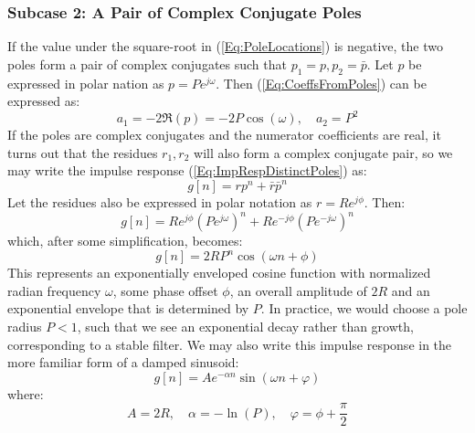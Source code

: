 \subsubsection{Subcase 2: A Pair of Complex Conjugate Poles}
If the value under the square-root in (\ref{Eq:PoleLocations}) is negative, the two poles form a pair of complex conjugates such that $p_1 = p, p_2 = \bar{p}$. Let $p$ be expressed in polar nation as $p = P e^{j \omega}$. Then (\ref{Eq:CoeffsFromPoles}) can be expressed as:
\begin{equation}
\label{Eq:CoeffsFromConjugatePoles}
\boxed
{
 a_1 = -2 \Re(p) = -2 P \cos(\omega), \quad a_2 = P^2
}
\end{equation}
If the poles are complex conjugates and the numerator coefficients are real, it turns out that the residues $r_1, r_2$ will also form a complex conjugate pair, so we may write the impulse response (\ref{Eq:ImpRespDistinctPoles}) as:
\begin{equation}
 g[n] = r p^n + \bar{r} \bar{p}^n
\end{equation}
Let the residues also be expressed in polar notation as $r = R e^{j \phi}$. Then:
\begin{equation}
 g[n] = R e^{j \phi} (P e^{j \omega})^n + R e^{-j \phi} (P e^{-j \omega})^n
\end{equation}
which, after some simplification, becomes:
\begin{equation}
 g[n] = 2 R P^n \cos(\omega n + \phi)
\end{equation}
This represents an exponentially enveloped cosine function with normalized radian frequency $\omega$, some phase offset $\phi$, an overall amplitude of $2R$ and an exponential envelope that is determined by $P$. In practice, we would choose a pole radius $P < 1$, such that we see an exponential decay rather than growth, corresponding to a stable filter. We may also write this impulse response in the more familiar form of a damped sinusoid:
\begin{equation}
\label{Eq:ImpRespDampedSine}
\boxed
{
 g[n] = A e^{-\alpha n} \sin(\omega n + \varphi)
}
\end{equation}
where:
\begin{equation}
\label{Eq:DampedSineParameters}
\boxed
{
  A = 2R, \quad \alpha = -\ln(P), \quad \varphi = \phi + \frac{\pi}{2}
}
\end{equation}


